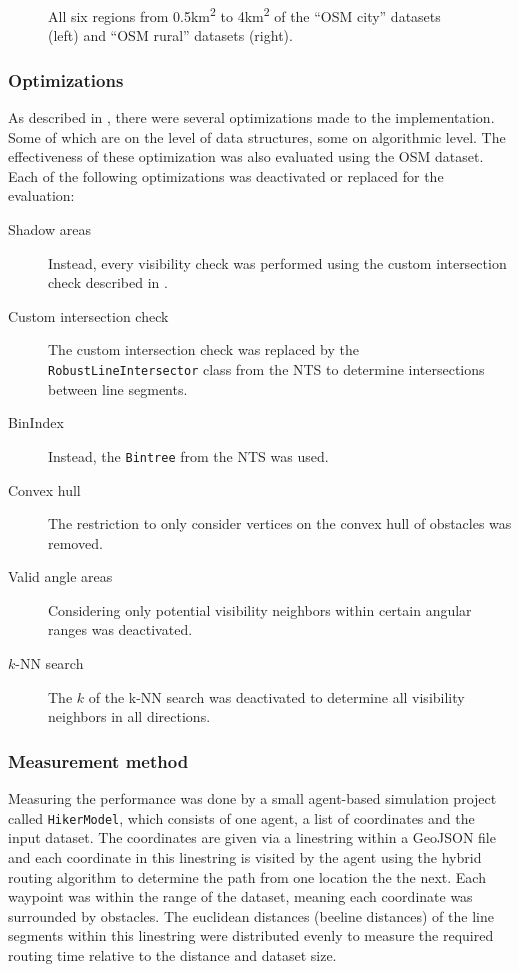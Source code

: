 \begin{figure}[h!]
\begin{minipage}[t]{.38\textwidth}
\begin{figcenter}
					\end{figcenter}
				\end{minipage}
				\caption{All six regions from 0.5km\textsuperscript{2} to 4km\textsuperscript{2} of the \enquote{OSM city} datasets (left) and \enquote{OSM rural} datasets (right).}
			\end{figure}
		
		\subsubsection{Optimizations}
		
			As described in , there were several optimizations made to the implementation.
			Some of which are on the level of data structures, some on algorithmic level.
			The effectiveness of these optimization was also evaluated using the OSM dataset.
			Each of the following optimizations was deactivated or replaced for the evaluation:

			\begin{description}
				\item[Shadow areas] Instead, every visibility check was performed using the custom intersection check described in .
				\item[Custom intersection check] The custom intersection check was replaced by the \texttt{RobustLineIntersector} class from the NTS to determine intersections between line segments.
				\item[BinIndex] Instead, the \texttt{Bintree} from the NTS was used.
				\item[Convex hull] The restriction to only consider vertices on the convex hull of obstacles was removed.
				\item[Valid angle areas] Considering only potential visibility neighbors within certain angular ranges was deactivated.
				\item[$k$-NN search] The $k$ of the k-NN search was deactivated to determine all visibility neighbors in all directions.
			\end{description}		
			
		\subsubsection{Measurement method}
		
			Measuring the performance was done by a small agent-based simulation project called \texttt{HikerModel}, which consists of one agent, a list of coordinates and the input dataset.
			The coordinates are given via a linestring within a GeoJSON file and each coordinate in this linestring is visited by the agent using the hybrid routing algorithm to determine the path from one location the the next.
			Each waypoint was within the range of the dataset, meaning each coordinate was surrounded by obstacles.
			The euclidean distances (beeline distances) of the line segments within this linestring were distributed evenly to measure the required routing time relative to the distance and dataset size.
			

